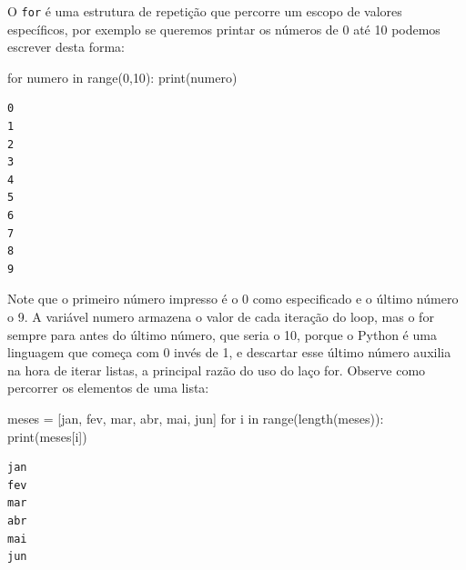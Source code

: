 \documentclass[
  letterpaper,
  DIV=11,
  numbers=noendperiod]{scrreprt}
\newenvironment{Shaded}{\begin{snugshade}}{\end{snugshade}}
\newcommand{\BuiltInTok}[1]{\textcolor[rgb]{0.00,0.23,0.31}{#1}}
\newcommand{\ControlFlowTok}[1]{\textcolor[rgb]{0.00,0.23,0.31}{#1}}
\newcommand{\DecValTok}[1]{\textcolor[rgb]{0.68,0.00,0.00}{#1}}
\newcommand{\KeywordTok}[1]{\textcolor[rgb]{0.00,0.23,0.31}{#1}}
\newcommand{\NormalTok}[1]{\textcolor[rgb]{0.00,0.23,0.31}{#1}}
\newcommand{\OperatorTok}[1]{\textcolor[rgb]{0.37,0.37,0.37}{#1}}
\newcommand{\StringTok}[1]{\textcolor[rgb]{0.13,0.47,0.30}{#1}}
\begin{document}
O \texttt{for} é uma estrutura de repetição que percorre um escopo de
valores específicos, por exemplo se queremos printar os números de 0 até
10 podemos escrever desta forma:

\begin{Shaded}
\begin{Highlighting}[]
\ControlFlowTok{for}\NormalTok{ numero }\KeywordTok{in} \BuiltInTok{range}\NormalTok{(}\DecValTok{0}\NormalTok{,}\DecValTok{10}\NormalTok{):}
    \BuiltInTok{print}\NormalTok{(numero)}
\end{Highlighting}
\end{Shaded}

\begin{tcolorbox}[enhanced jigsaw, breakable, leftrule=.75mm, left=2mm, opacityback=0, bottomrule=.15mm, toprule=.15mm, rightrule=.15mm, arc=.35mm, colback=white]

\begin{verbatim}
0
1
2
3
4
5
6
7
8
9
\end{verbatim}

\end{tcolorbox}

Note que o primeiro número impresso é o 0 como especificado e o último
número o 9. A variável numero armazena o valor de cada iteração do loop,
mas o for sempre para antes do último número, que seria o 10, porque o
Python é uma linguagem que começa com 0 invés de 1, e descartar esse
último número auxilia na hora de iterar listas, a principal razão do uso
do laço for. Observe como percorrer os elementos de uma lista:

\begin{Shaded}
\begin{Highlighting}[]
\NormalTok{meses }\OperatorTok{=}\NormalTok{ [}\StringTok{\textquotesingle{}jan\textquotesingle{}}\NormalTok{, }\StringTok{\textquotesingle{}fev\textquotesingle{}}\NormalTok{, }\StringTok{\textquotesingle{}mar\textquotesingle{}}\NormalTok{, }\StringTok{\textquotesingle{}abr\textquotesingle{}}\NormalTok{, }\StringTok{\textquotesingle{}mai\textquotesingle{}}\NormalTok{, }\StringTok{\textquotesingle{}jun\textquotesingle{}}\NormalTok{]}
\ControlFlowTok{for}\NormalTok{ i }\KeywordTok{in} \BuiltInTok{range}\NormalTok{(length(meses)):}
    \BuiltInTok{print}\NormalTok{(meses[i])}
\end{Highlighting}
\end{Shaded}

\begin{tcolorbox}[enhanced jigsaw, breakable, leftrule=.75mm, left=2mm, opacityback=0, bottomrule=.15mm, toprule=.15mm, rightrule=.15mm, arc=.35mm, colback=white]

\begin{verbatim}
jan
fev
mar
abr
mai
jun
\end{verbatim}

\end{tcolorbox}
\end{document}
